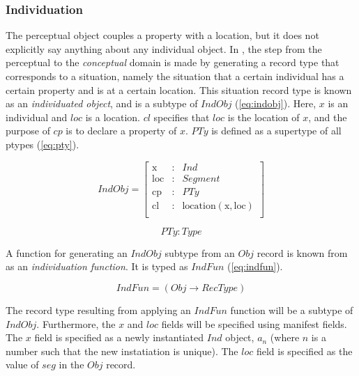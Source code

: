 \subsubsection{Individuation}

The perceptual object couples a property with a location, but it does not explicitly say anything about any individual object.
In \cite{lspc}, the step from the perceptual to the \textit{conceptual} domain is made by generating a record type that corresponds to a situation, namely the situation that a certain individual has a certain property and is at a certain location.
This situation record type is known as an \textit{individuated object}, and is a subtype of $IndObj$ (\autoref{eq:indobj}).
Here, $x$ is an individual and $loc$ is a location.
$cl$ specifies that $loc$ is the location of $x$, and the purpose of $cp$ is to declare a property of $x$.
$PTy$ is defined as a supertype of all ptypes (\autoref{eq:pty}).

\begin{equation}\label{eq:indobj}
IndObj = \left[\begin{array}{rcl}
\text{x} &:& Ind \\
\text{loc} &:& Segment \\
\text{cp} &:& PTy \\
\text{cl} &:& \text{location}(\text{x}, \text{loc}) \\
\end{array}\right]
\end{equation}

\begin{equation}\label{eq:pty}
PTy : Type
\end{equation}

A function for generating an $IndObj$ subtype from an $Obj$ record is known from \cite{lspc} as an \textit{individuation function}.
It is typed as $IndFun$ (\autoref{eq:indfun}).

\begin{equation}\label{eq:indfun}
IndFun = ( Obj \rightarrow RecType )
\end{equation}

The record type resulting from applying an $IndFun$ function will be a subtype of $IndObj$.
Furthermore, the $x$ and $loc$ fields will be specified using manifest fields.
The $x$ field is specified as a newly instantiated $Ind$ object, $a_n$ (where $n$ is a number such that the new instatiation is unique).
The $loc$ field is specified as the value of $seg$ in the $Obj$ record.

